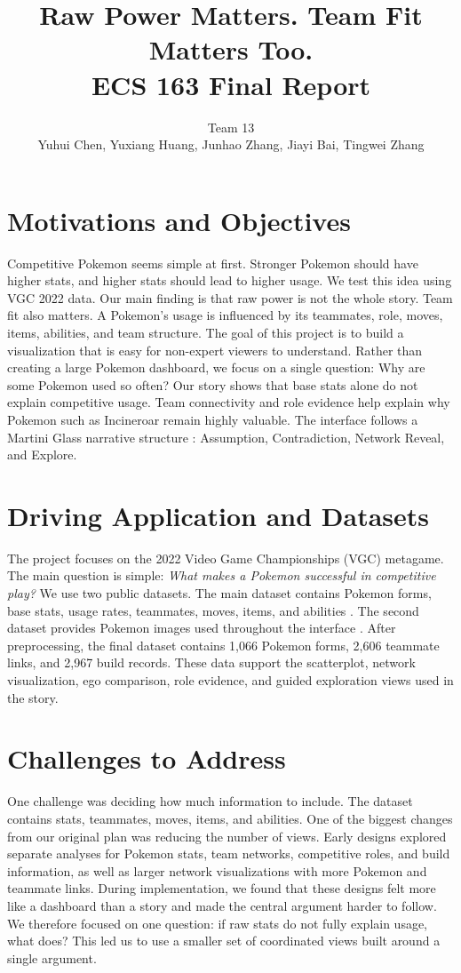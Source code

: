 \documentclass[11pt]{article}
\title{\vspace{-2.2em}\textbf{Raw Power Matters. Team Fit Matters Too.}\\
\large ECS 163 Final Report}
\author{Team 13\\Yuhui Chen, Yuxiang Huang, Junhao Zhang, Jiayi Bai, Tingwei Zhang}
\date{}
\newcommand{\tightsection}[1]{\vspace{-0.25em}\section{#1}\vspace{-0.25em}}
\begin{document}
\maketitle
\enlargethispage{2\baselineskip}
\vspace{-2.1em}

\tightsection{Motivations and Objectives}
Competitive Pokemon seems simple at first. Stronger Pokemon should have higher stats, and higher stats should lead to higher usage. We test this idea using VGC 2022 data.
Our main finding is that raw power is not the whole story. Team fit also matters. A Pokemon's usage is influenced by its teammates, role, moves, items, abilities, and team structure.
The goal of this project is to build a visualization that is easy for non-expert viewers to understand. Rather than creating a large Pokemon dashboard, we focus on a single question: Why are some Pokemon used so often?
Our story shows that base stats alone do not explain competitive usage. Team connectivity and role evidence help explain why Pokemon such as Incineroar remain highly valuable. The interface follows a Martini Glass narrative structure \cite{segel2010narrative}: Assumption, Contradiction, Network Reveal, and Explore.

\tightsection{Driving Application and Datasets}
The project focuses on the 2022 Video Game Championships (VGC) metagame. The main question is simple: \textit{What makes a Pokemon successful in competitive play?}
We use two public datasets. The main dataset contains Pokemon forms, base stats, usage rates, teammates, moves, items, and abilities \cite{carbone2022competitive}. The second dataset provides Pokemon images used throughout the interface \cite{singh32000pokemon}.
After preprocessing, the final dataset contains 1,066 Pokemon forms, 2,606 teammate links, and 2,967 build records. These data support the scatterplot, network visualization, ego comparison, role evidence, and guided exploration views used in the story.

\tightsection{Challenges to Address}
One challenge was deciding how much information to include. The dataset contains stats, teammates, moves, items, and abilities. One of the biggest changes from our original plan was reducing the number of views. Early designs explored separate analyses for Pokemon stats, team networks, competitive roles, and build information, as well as larger network visualizations with more Pokemon and teammate links. During implementation, we found that these designs felt more like a dashboard than a story and made the central argument harder to follow. We therefore focused on one question: if raw stats do not fully explain usage, what does? This led us to use a smaller set of coordinated views built around a single argument.
\end{document}
